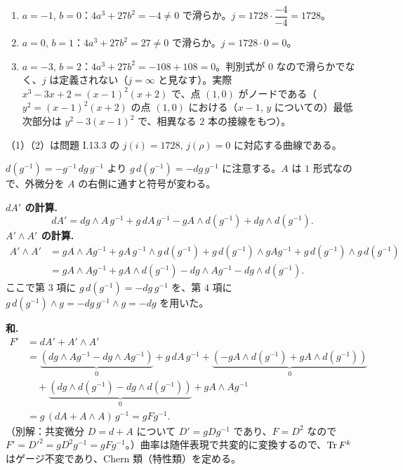 \begin{enumerate}
  \item $a=-1$, $b=0$：$4a^3+27b^2=-4\neq0$ で滑らか。$j=1728\cdot\dfrac{-4}{-4}=1728$。
  \item $a=0$, $b=1$：$4a^3+27b^2=27\neq0$ で滑らか。$j=1728\cdot0=0$。
  \item $a=-3$, $b=2$：$4a^3+27b^2=-108+108=0$。判別式が $0$ なので滑らかでなく、$j$ は定義されない（$j=\infty$ と見なす）。実際 $x^3-3x+2=(x-1)^2(x+2)$ で、点 $(1,0)$ がノードである（$y^2=(x-1)^2(x+2)$ の点 $(1,0)$ における（$x-1$, $y$ についての）最低次部分は $y^2-3(x-1)^2$ で、相異なる $2$ 本の接線をもつ）。
\end{enumerate}
（1）（2）は問題 I.13.3 の $j(i)=1728$, $j(\rho)=0$ に対応する曲線である。

$d(g^{-1})=-g^{-1}\,dg\,g^{-1}$ より $g\,d(g^{-1})=-dg\,g^{-1}$ に注意する。$A$ は $1$ 形式なので、外微分を $A$ の右側に通すと符号が変わる。

\textbf{$dA'$ の計算.}
\[
  dA'=dg\wedge A\,g^{-1}+g\,dA\,g^{-1}-gA\wedge d(g^{-1})+dg\wedge d(g^{-1}).
\]
\textbf{$A'\wedge A'$ の計算.}
\begin{align*}
  A'\wedge A'&=gA\wedge Ag^{-1}+gA\,g^{-1}\wedge g\,d(g^{-1})+g\,d(g^{-1})\wedge gAg^{-1}+g\,d(g^{-1})\wedge g\,d(g^{-1})\\
  &=gA\wedge Ag^{-1}+gA\wedge d(g^{-1})-dg\wedge Ag^{-1}-dg\wedge d(g^{-1}).
\end{align*}
ここで第 $3$ 項に $g\,d(g^{-1})=-dg\,g^{-1}$ を、第 $4$ 項に $g\,d(g^{-1})\wedge g=-dg\,g^{-1}\wedge g=-dg$ を用いた。

\textbf{和.}
\begin{align*}
  F'&=dA'+A'\wedge A'\\
  &=\underbrace{(dg\wedge Ag^{-1}-dg\wedge Ag^{-1})}_{0}+g\,dA\,g^{-1}+\underbrace{(-gA\wedge d(g^{-1})+gA\wedge d(g^{-1}))}_{0}\\
  &\quad+\underbrace{(dg\wedge d(g^{-1})-dg\wedge d(g^{-1}))}_{0}+gA\wedge Ag^{-1}\\
  &=g\,(dA+A\wedge A)\,g^{-1}=gFg^{-1}.
\end{align*}
（別解：共変微分 $D=d+A$ について $D'=gDg^{-1}$ であり、$F=D^2$ なので $F'=D'^2=gD^2g^{-1}=gFg^{-1}$。）曲率は随伴表現で共変的に変換するので、$\operatorname{Tr} F^k$ はゲージ不変であり、Chern 類（特性類）を定める。

